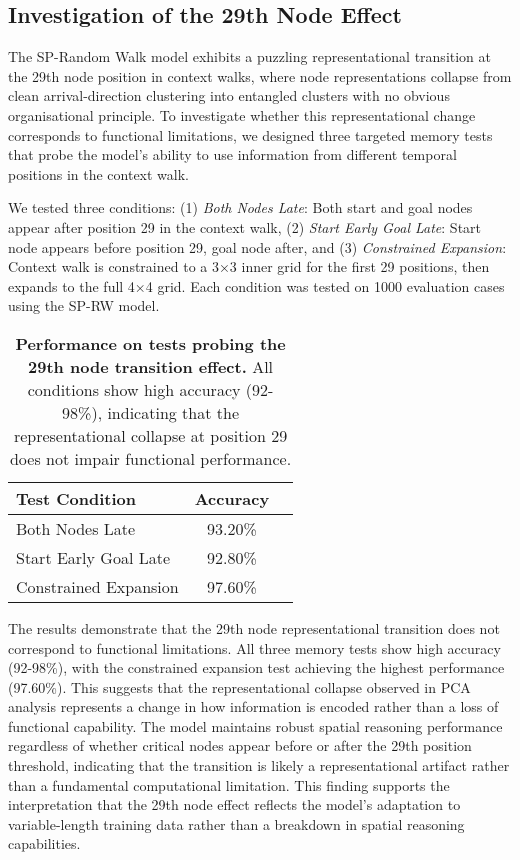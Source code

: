 \subsection{Investigation of the 29th Node Effect}

The SP-Random Walk model exhibits a puzzling representational transition at the 29th node position in context walks, where node representations collapse from clean arrival-direction clustering into entangled clusters with no obvious organisational principle. To investigate whether this representational change corresponds to functional limitations, we designed three targeted memory tests that probe the model's ability to use information from different temporal positions in the context walk.

We tested three conditions: (1) \textit{Both Nodes Late}: Both start and goal nodes appear after position 29 in the context walk, (2) \textit{Start Early Goal Late}: Start node appears before position 29, goal node after, and (3) \textit{Constrained Expansion}: Context walk is constrained to a 3×3 inner grid for the first 29 positions, then expands to the full 4×4 grid. Each condition was tested on 1000 evaluation cases using the SP-RW model.

\begin{table}[H]
\centering
\caption[Analysis results for SP-Random Walk model]{\textbf{Performance on tests probing the 29th node transition effect.} All conditions show high accuracy (92-98\%), indicating that the representational collapse at position 29 does not impair functional performance.}
\label{tab:memory_analysis_results}
\begin{tabular}{lcc}
\hline
\textbf{Test Condition} & \textbf{Accuracy}\\
\hline
Both Nodes Late & 93.20\% \\
Start Early Goal Late & 92.80\% \\
Constrained Expansion & 97.60\% \\
\hline
\end{tabular}
\end{table}

The results demonstrate that the 29th node representational transition does not correspond to functional limitations. All three memory tests show high accuracy (92-98\%), with the constrained expansion test achieving the highest performance (97.60\%). This suggests that the representational collapse observed in PCA analysis represents a change in how information is encoded rather than a loss of functional capability. The model maintains robust spatial reasoning performance regardless of whether critical nodes appear before or after the 29th position threshold, indicating that the transition is likely a representational artifact rather than a fundamental computational limitation. This finding supports the interpretation that the 29th node effect reflects the model's adaptation to variable-length training data rather than a breakdown in spatial reasoning capabilities.

